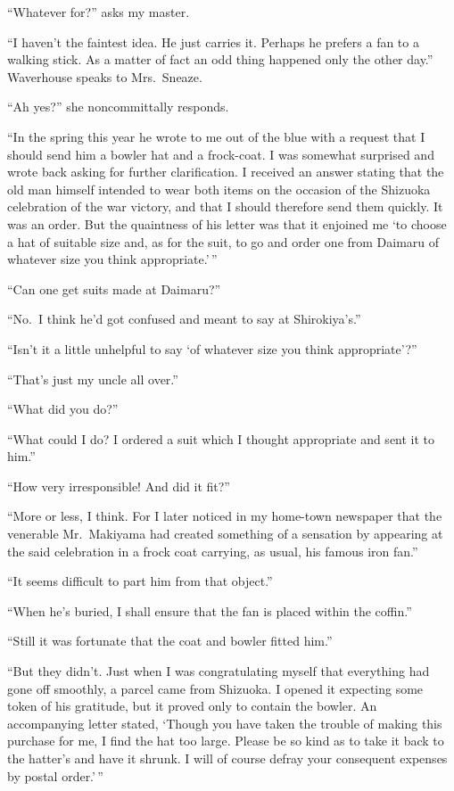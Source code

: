 \documentclass[12pt, openright]{book}
\begin{document}
``Whatever for?'' asks my master.

``I haven't the faintest idea. He just carries it. Perhaps he prefers a
fan to a walking stick. As a matter of fact an odd thing happened only
the other day.'' Waverhouse speaks to Mrs.~Sneaze.

``Ah yes?'' she noncommittally responds.

``In the spring this year he wrote to me out of the blue with a request
that I should send him a bowler hat and a frock-coat. I was somewhat
surprised and wrote back asking for further clarification. I received an
answer stating that the old man himself intended to wear both items on
the occasion of the Shizuoka celebration of the war victory, and that I
should therefore send them quickly. It was an order. But the quaintness
of his letter was that it enjoined me `to choose a hat of suitable size
and, as for the suit, to go and order one from Daimaru of whatever size
you think appropriate.'\,''

``Can one get suits made at Daimaru?''

``No.~I think he'd got confused and meant to say at Shirokiya's.''

``Isn't it a little unhelpful to say `of whatever size you think
appropriate'?''

``That's just my uncle all over.''

``What did you do?''

``What could I do? I ordered a suit which I thought appropriate and sent
it to him.''

``How very irresponsible! And did it fit?''

``More or less, I think. For I later noticed in my home-town newspaper
that the venerable Mr.~Makiyama had created something of a sensation by
appearing at the said celebration in a frock coat carrying, as usual,
his famous iron fan.''

``It seems difficult to part him from that object.''

``When he's buried, I shall ensure that the fan is placed within the
coffin.''

``Still it was fortunate that the coat and bowler fitted him.''

``But they didn't. Just when I was congratulating myself that everything
had gone off smoothly, a parcel came from Shizuoka. I opened it
expecting some token of his gratitude, but it proved only to contain the
bowler. An accompanying letter stated, `Though you have taken the
trouble of making this purchase for me, I find the hat too large. Please
be so kind as to take it back to the hatter's and have it shrunk. I will
of course defray your consequent expenses by postal order.'\,''
\end{document}
